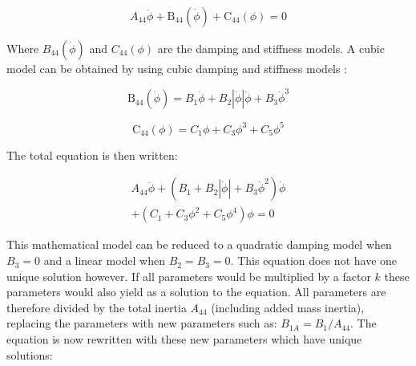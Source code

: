            
    
    \begin{equation}
A_{44} \ddot{\phi} + \operatorname{B_{44}}\left(\dot{\phi}\right) + \operatorname{C_{44}}\left(\phi\right) = 0
\label{eq:equation}
\end{equation}

    

    Where $B_{44}(\dot{\phi})$ and $C_{44}(\phi)$ are the damping and
stiffness models. A cubic model can be obtained by using cubic damping
\cite{7505983/FB64RGPF} and stiffness models \cite{7505983/KL7A3RIV}:
 
            
    
    \begin{equation}
\operatorname{B_{44}}\left(\dot{\phi}\right) = B_{1} \dot{\phi} + B_{2} \left|{\dot{\phi}}\right| \dot{\phi} + B_{3} \dot{\phi}^{3}
\label{eq:equation}
\end{equation}

    
 
            
    
    \begin{equation}
\operatorname{C_{44}}\left(\phi\right) = C_{1} \phi + C_{3} \phi^{3} + C_{5} \phi^{5}
\label{eq:equation}
\end{equation}

    

    The total equation is then written:
 
            
    
    \begin{equation}
\begin{aligned}
A_{44} \ddot{\phi} + \left(B_{1} + B_{2} \left|{\dot{\phi}}\right| + B_{3} \dot{\phi}^{2}\right) \dot{\phi} \\ + \left(C_{1} + C_{3} \phi^{2} + C_{5} \phi^{4}\right) \phi = 0
\end{aligned}
\label{eq:equation}
\end{equation}

    

    This mathematical model can be reduced to a quadratic damping model when
$B_3=0$ and a linear model when $B_2=B_3=0$. This equation does not
have one unique solution however. If all parameters would be multiplied
by a factor $k$ these parameters would also yield as a solution to the
equation. All parameters are therefore divided by the total inertia
$A_{44}$ (including added mass inertia), replacing the parameters with
new parameters such as: $B_{1A} = B_1/A_{44}$. The equation is now
rewritten with these new parameters which have unique solutions:
 
